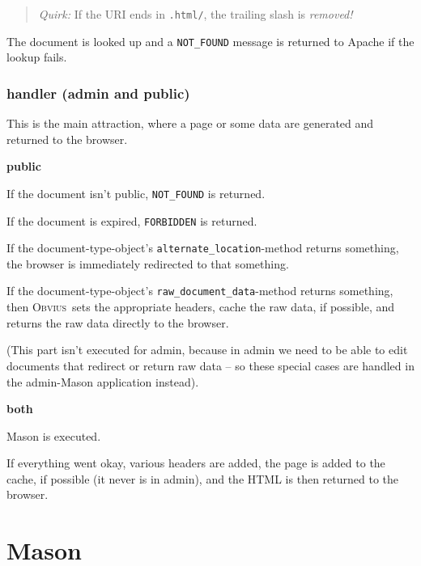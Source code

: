 \documentclass[a4paper,12pt]{article}
\newcommand{\obvius}{\textsc{Obvius}}
\newcommand{\notfound}{\texttt{NOT\_FOUND}}
\newcommand{\forbidden}{\texttt{FORBIDDEN}}
\newenvironment{quirk}{\begin{quote}\emph{Quirk:}}{\end{quote}}
\begin{document}
\begin{quirk}
  If the URI ends in \texttt{.html/}, the trailing slash is \emph{removed!}
\end{quirk}


The document is looked up
and a {\notfound} message is returned to Apache if the
lookup fails.


\subsubsection{handler (admin and public)}

This is the main attraction, where a page or some data are generated
and returned to the browser.

\textbf{public}

If the document isn't public, {\notfound} is returned.

If the document is expired, {\forbidden} is returned.

If the document-type-object's \texttt{alternate\_location}-method
returns something, the browser is immediately redirected to that
something.

If the document-type-object's \texttt{raw\_document\_data}-method
returns something, then \obvius\ sets the appropriate headers, cache
the raw data, if possible, and returns the raw data directly to the
browser.

(This part isn't executed for admin, because in admin we need to be
able to edit documents that redirect or return raw data -- so these
special cases are handled in the admin-Mason application instead).

\textbf{both}

Mason is executed.

If everything went okay, various headers are added, the page is added
to the cache, if possible (it never is in admin), and the HTML is then
returned to the browser.


\section{Mason}
\end{document}
